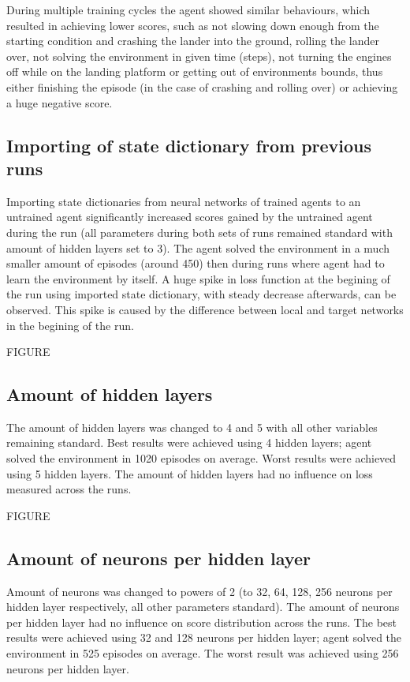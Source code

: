 \documentclass{article}
\begin{document}
During multiple training cycles the agent showed similar behaviours, which resulted in achieving lower scores, such as not slowing down enough from the starting condition and crashing the lander into the ground, rolling the lander over, not solving the environment in given time (steps), not turning the engines off while on the landing platform or getting out of environments bounds, thus either finishing the episode (in the case of crashing and rolling over) or achieving a huge negative score.

\subsection*{Importing of state dictionary from previous runs}
Importing state dictionaries from neural networks of trained agents to an untrained agent significantly increased scores gained by the untrained agent during the run (all parameters during both sets of runs remained standard with amount of hidden layers set to 3). The agent solved the environment in a much smaller amount of episodes (around 450) then during runs where agent had to learn the environment by itself. A huge spike in loss function at the begining of the run using imported state dictionary, with steady decrease afterwards, can be observed. This spike is caused by the difference between local and target networks in the begining of the run.

FIGURE

\subsection*{Amount of hidden layers}
The amount of hidden layers was changed to 4 and 5 with all other variables remaining standard. Best results were achieved using 4 hidden layers; agent solved the environment in 1020 episodes on average. Worst results were achieved using 5 hidden layers. The amount of hidden layers had no influence on loss measured across the runs.

FIGURE
\pagebreak

\subsection*{Amount of neurons per hidden layer}
Amount of neurons was changed to powers of 2 (to 32, 64, 128, 256 neurons per hidden layer respectively, all other parameters standard). The amount of neurons per hidden layer had no influence on score distribution across the runs. The best results were achieved using 32 and 128 neurons per hidden layer; agent solved the environment in 525 episodes on average. The worst result was achieved using 256 neurons per hidden layer.
\end{document}
